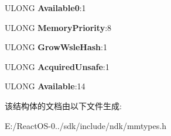 \begin{DoxyCompactItemize}
\mbox{\label{struct___m_m_s_u_p_p_o_r_t___f_l_a_g_s_ae1c080ef1225d9e899c312818e8299fd}} 
U\+L\+O\+NG {\bfseries Available0}\+:1
\item 
\mbox{\label{struct___m_m_s_u_p_p_o_r_t___f_l_a_g_s_aa7343e63eedbe4eabfb603813a31fa97}} 
U\+L\+O\+NG {\bfseries Memory\+Priority}\+:8
\item 
\mbox{\label{struct___m_m_s_u_p_p_o_r_t___f_l_a_g_s_a041806ba470794a050dae76ad3d38a69}} 
U\+L\+O\+NG {\bfseries Grow\+Wsle\+Hash}\+:1
\item 
\mbox{\label{struct___m_m_s_u_p_p_o_r_t___f_l_a_g_s_a5aecdbf783036cd246b262b87b4f2c73}} 
U\+L\+O\+NG {\bfseries Acquired\+Unsafe}\+:1
\item 
\mbox{\label{struct___m_m_s_u_p_p_o_r_t___f_l_a_g_s_a0c7bb241e3d3ae8b1d72ea1494848e1a}} 
U\+L\+O\+NG {\bfseries Available}\+:14
\end{DoxyCompactItemize}


该结构体的文档由以下文件生成\+:\begin{DoxyCompactItemize}
\item 
E\+:/\+React\+O\+S-\/0../sdk/include/ndk/mmtypes.\+h\end{DoxyCompactItemize}
